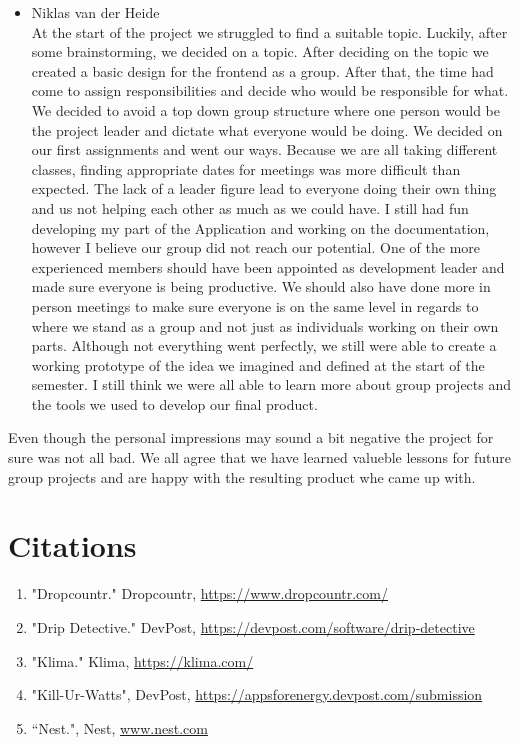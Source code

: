\documentclass[10pt]{article}
\begin{document}
\begin{multicols*}{2}
\begin{itemize}
  \item {Niklas van der Heide}\\
  At the start of the project we struggled to find a suitable topic. Luckily, after some brainstorming, we decided on a topic. After deciding on the topic we created a basic design for the frontend as a group. After that, the time had come to assign responsibilities and decide who would be responsible for what. We decided to avoid a top down group structure where one person would be the project leader and dictate what everyone would be doing. We decided on our first assignments and went our ways. Because we are all taking different classes, finding appropriate dates for meetings was more difficult than expected. The lack of a leader figure lead to everyone doing their own thing and us not helping each other as much as we could have. I still had fun developing my part of the Application and working on the documentation, however I believe our group did not reach our potential. One of the more experienced members should have been appointed as development leader and made sure everyone is being productive. We should also have done more in person meetings to make sure everyone is on the same level in regards to where we stand as a group and not just as individuals working on their own parts.
  Although not everything went perfectly, we still were able to create a working prototype of the idea we imagined and defined at the start of the semester. I still think we were all able to learn more about group projects and the tools we used to develop our final product.

\end{itemize}

Even though the personal impressions may sound a bit negative the project for sure was not all bad.
We all agree that we have learned valueble lessons for future group projects and are happy with the resulting product whe came up with.

\end{multicols*}

\clearpage
\section{Citations}
\begin{enumerate}
  \item "Dropcountr." Dropcountr, \href{https://www.dropcountr.com/}{https://www.dropcountr.com/}
  \item "Drip Detective." DevPost, \href{https://devpost.com/software/drip-detective}{https://devpost.com/software/drip-detective}
  \item "Klima." Klima, \href{https://klima.com/}{https://klima.com/}
  \item "Kill-Ur-Watts", DevPost, \href{https://appsforenergy.devpost.com/submission}{https://appsforenergy.devpost.com/submission}
  \item “Nest.", Nest, \href{http://www.nest.com}{www.nest.com}
\end{enumerate}
\end{document}
